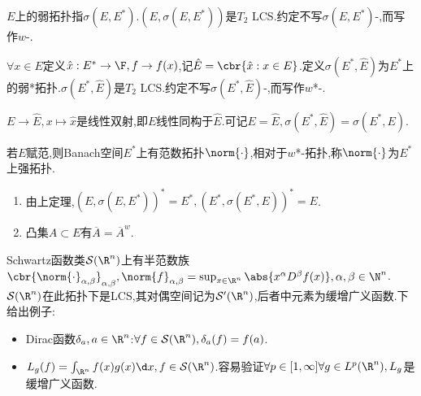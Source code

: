 \documentclass{article}
\begin{document}
\begin{definition}
$E$上的弱拓扑指$\sigma(E,E^*)$.$(E,\sigma(E,E^*))$是$T_2$ LCS.约定不写$\sigma(E,E^*)$-,而写作$w$-.

$\forall x\in E$定义$\hat{x}:E^*\to \F, f\to f(x)$,记$\hat{E}=\cbr{\hat{x}:x\in E}$.定义$\sigma(E^*,\hat{E})$为$E^*$上的弱*拓扑.$\sigma(E^*,\hat{E})$是$T_2$ LCS.约定不写$\sigma(E^*,\hat{E})$-,而写作$w$*-.

$E\to \hat{E}, x\mapsto \hat{x}$是线性双射,即$E$线性同构于$\hat{E}$.可记$E=\hat{E},\sigma(E^*,\hat{E})=\sigma(E^*,E)$.

若$E$赋范,则Banach空间$E^*$上有范数拓扑$\norm{\cdot}$,相对于$w$*-拓扑,称$\norm{\cdot}$为$E^*$上强拓扑.
\end{definition}
\begin{proposition}
    \begin{enumerate}
        \item 由上定理,$(E,\sigma(E,E^*))^*=E^*,(E^*,\sigma(E^*,E))^*=E$.
        \item 凸集$A\subset E$有$\overline{A}=\overline{A}^w$.
    \end{enumerate}
\end{proposition}
\begin{example}[缓增广义函数]
    Schwartz函数类$\mathcal{S}(\R^n)$上有半范数族$\cbr{\norm{\cdot}_{\alpha,\beta}}_{\alpha,\beta},\norm{f}_{\alpha,\beta}=\sup_{x\in \R^n}\abs{x^\alpha D^\beta f(x)},\alpha,\beta\in \N^n$.\\
    $\mathcal{S}(\R^n)$在此拓扑下是LCS,其对偶空间记为$\mathcal{S}'(\R^n)$,后者中元素为缓增广义函数.下给出例子:

    \begin{itemize}
        \item {Dirac函数}$\delta_a, a\in \R^n$:$\forall f\in \mathcal{S}(\R^n), \delta_a(f)=f(a)$.
        \item $L_g(f)=\int_{\R^n}f(x)g(x)\d x, f\in \mathcal{S}(\R^n)$.容易验证$\forall p\in [1,\infty]\forall g\in L^p(\R^n),L_g$是缓增广义函数.
    \end{itemize}
\end{example}
\end{document}
